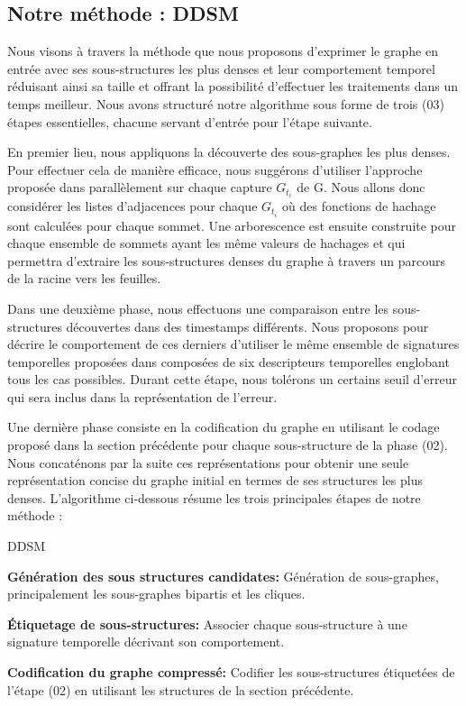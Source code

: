 			\subsection{Notre méthode : DDSM}
			 Nous visons à travers la méthode que nous proposons d'exprimer le graphe en entrée avec ses sous-structures les plus denses et leur comportement temporel réduisant ainsi sa taille et offrant la possibilité d'effectuer les traitements dans un temps meilleur. Nous avons structuré notre algorithme sous forme de trois (03) étapes essentielles, chacune servant d'entrée pour l'étape suivante.
			 
			 En premier lieu, nous appliquons la découverte des sous-graphes les plus denses. Pour effectuer cela de manière efficace, nous suggérons d'utiliser l'approche proposée dans \citep{hernandez2014compressed} parallèlement sur chaque capture $G_{t_{i}}$ de G. Nous allons donc considérer les listes d'adjacences pour chaque $G_{t_{i}}$ où des fonctions de hachage sont calculées pour chaque sommet. Une arborescence est ensuite construite pour chaque ensemble de sommets ayant les même valeurs de hachages et qui permettra d'extraire les sous-structures denses du graphe à travers un parcours de la racine vers les feuilles. 
			 
			 Dans une deuxième phase, nous effectuons une comparaison entre les sous-structures découvertes dans des timestamps différents. Nous proposons pour décrire le comportement de ces derniers d'utiliser le même ensemble de signatures temporelles proposées dans \citep{shah2015timecrunch} composées de six descripteurs temporelles englobant tous les cas possibles. Durant cette étape, nous tolérons un certains seuil d'erreur qui sera inclus dans la représentation de l'erreur.
			 
			 Une dernière phase consiste en la codification du graphe en utilisant le codage proposé dans la section précédente pour chaque sous-structure de la phase (02). Nous concaténons par la suite ces représentations pour obtenir une seule représentation concise du graphe initial en termes de ses structures les plus denses. 
			L'algorithme ci-dessous résume les trois principales étapes de notre méthode :
			\begin{algorithm}
					\label{alg:DDSM}
					\caption{DDSM}
					\label{Pseudo Algorithme de la méthode proposée (DDSM)}
				\begin{algorithmic} [1]
					\STATE \textbf{Génération des sous structures candidates: }Génération de sous-graphes, principalement les sous-graphes bipartis et les cliques.
					
					\STATE  \textbf{Étiquetage de sous-structures: }Associer chaque sous-structure à une signature temporelle décrivant son comportement.
					
					\STATE \textbf{Codification du graphe compressé: }Codifier les sous-structures étiquetées de l'étape (02) en utilisant les structures de la section précédente.
				\end{algorithmic}
			\end{algorithm}
			
